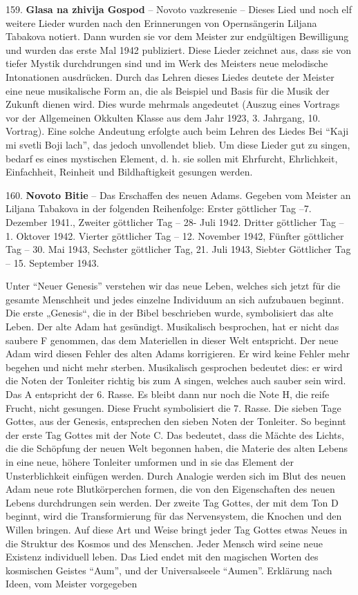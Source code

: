 \documentclass[11pt,a5paper,twoside]{article}
\begin{document}
159. \textbf{Glasa na zhivija Gospod} -- Novoto vazkresenie  -- Dieses Lied und noch elf weitere Lieder wurden nach den Erinnerungen von Opernsängerin Liljana Tabakova notiert. Dann wurden sie vor dem Meister zur endgültigen Bewilligung und wurden das erste Mal 1942 publiziert.  Diese Lieder zeichnet aus, dass sie von tiefer Mystik durchdrungen sind und im Werk des Meisters neue melodische Intonationen ausdrücken. Durch das Lehren dieses Liedes deutete der Meister eine neue musikalische Form an, die als Beispiel und Basis für die Musik der Zukunft dienen wird. Dies wurde mehrmals angedeutet (Auszug eines Vortrags vor der Allgemeinen Okkulten Klasse aus dem Jahr 1923, 3. Jahrgang, 10. Vortrag). Eine solche Andeutung erfolgte auch beim Lehren des Liedes Bei "`Kaji mi svetli Boji lach"', das jedoch unvollendet blieb. Um diese Lieder gut zu singen, bedarf es eines mystischen Element, d. h. sie sollen mit Ehrfurcht, Ehrlichkeit, Einfachheit, Reinheit und Bildhaftigkeit gesungen werden. 

160. \textbf{Novoto Bitie} -- Das Erschaffen des neuen Adams. Gegeben vom Meister an Liljana Tabakova in der folgenden Reihenfolge: Erster göttlicher Tag --7. Dezember 1941., Zweiter göttlicher Tag -- 28- Juli 1942. Dritter göttlicher Tag -- 1. Oktover 1942. Vierter göttlicher Tag -- 12. November 1942, Fünfter göttlicher Tag -- 30. Mai 1943, Sechster göttlicher Tag, 21. Juli 1943, Siebter Göttlicher Tag -- 15. September 1943. 

Unter "`Neuer Genesis"' verstehen wir das neue Leben, welches sich jetzt für die gesamte Menschheit und jedes einzelne Individuum an sich aufzubauen beginnt. Die erste „Genesis“, die in der Bibel beschrieben wurde, symbolisiert das alte Leben. Der alte Adam hat gesündigt. Musikalisch besprochen, hat er nicht das saubere F genommen, das dem Materiellen in dieser Welt entspricht. Der neue Adam wird diesen Fehler des alten Adams korrigieren. Er wird keine Fehler mehr begehen und nicht mehr sterben. Musikalisch gesprochen bedeutet dies: er wird die Noten der Tonleiter richtig bis zum A singen, welches auch sauber sein wird. Das A entspricht der 6. Rasse. Es bleibt dann nur noch die Note H, die reife Frucht, nicht gesungen. Diese Frucht symbolisiert die 7. Rasse. Die sieben Tage Gottes, aus der Genesis, entsprechen den sieben Noten der Tonleiter. So beginnt der erste Tag Gottes mit der Note C. Das bedeutet, dass die Mächte des Lichts, die die Schöpfung der neuen Welt begonnen haben, die Materie des alten Lebens in eine neue, höhere Tonleiter umformen und in sie das Element der Unsterblichkeit einfügen werden. Durch Analogie werden sich im Blut des neuen Adam neue rote Blutkörperchen formen, die von den Eigenschaften des neuen Lebens durchdrungen sein werden. Der zweite Tag Gottes, der mit dem Ton D beginnt, wird die Transformierung für das Nervensystem, die Knochen und den Willen bringen. Auf diese Art und Weise bringt jeder Tag Gottes etwas Neues in die Struktur des Kosmos und des Menschen. Jeder Mensch wird seine neue Existenz individuell leben. Das Lied endet mit den magischen Worten des kosmischen Geistes "`Aum"', und der Universalseele "`Aumen"'. Erklärung nach Ideen, vom Meister vorgegeben
\end{document}
